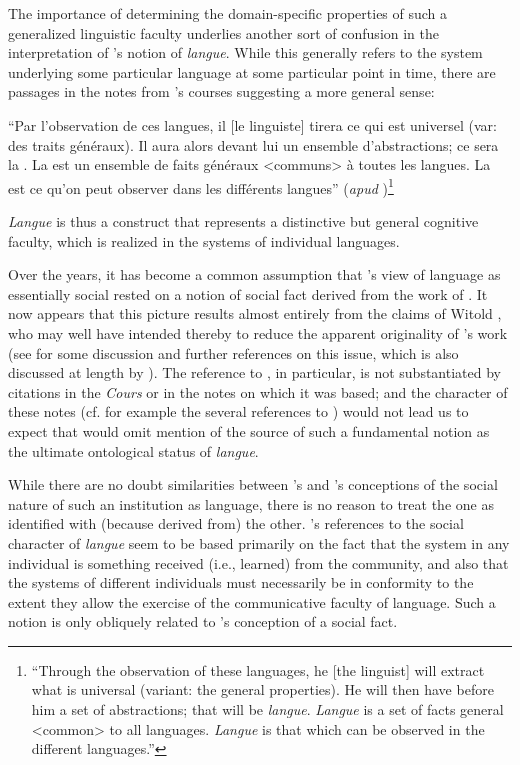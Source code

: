 The importance of determining the domain-specific properties of such a
generalized linguistic faculty underlies another sort of confusion in
the interpretation of {\Saussure}'s notion of \emph{langue}.  While this
generally refers to the system underlying some particular language at
some particular point in time, there are passages in the notes from
{\Saussure}'s courses suggesting a more general sense:

\begin{modquote}
  ``Par l'observation de ces langues, il [le linguiste] tirera ce qui
  est universel (var: des traits généraux).  Il aura alors devant
  lui un ensemble d'abstractions; ce sera la .  La  est un
  ensemble de faits généraux <communs> à toutes les langues.  La
   est ce qu'on peut observer dans les différents langues''
  (\emph{apud} \citealt[157]{godel57:sources})\footnote{``Through the observation of
    these languages, he {[the linguist]} will extract what is
    universal (variant: the general properties). He will then have
    before him a set of abstractions; that will be
    \emph{langue}. \emph{Langue} is a set of facts general <common> to
    all languages. \emph{Langue} is that which can be observed in the
    different languages.''}
\end{modquote}
\emph{Langue} is thus a construct that represents a distinctive
but general cognitive faculty, which is realized in the systems of
individual languages.

Over the years, it has become a common assumption that {\Saussure}'s view
of language as essentially social rested on a notion of social fact
derived from the work of .  It now appears that this picture
results almost entirely from the claims of Witold
\citet{doroszewski33:remarks,doroszewski33:saussure}, who may well
have intended thereby to reduce the apparent originality of {\Saussure}'s
work (see \citet[393f, 397f]{percival77:rvw.koerner.saussure} for some
discussion and further references on this issue, which is also
discussed at length by \citet{koerner73:saussure}).  The reference to
{\Durkheim}, in particular, is not substantiated by citations in the
\textsl{Cours} or in the notes on which it was based; and the
character of these notes (cf.  for example the several references to
{\Whitney}) would not lead us to expect that {\Saussure} would omit mention
of the source of such a fundamental notion as the ultimate ontological
status of \emph{langue}.

While there are no doubt similarities between {\Saussure}'s and
{\Durkheim}'s conceptions of the social nature of such an institution as
language, there is no reason to treat the one as identified with
(because derived from) the other.  {\Saussure}'s references to the social
character of \emph{langue} seem to be based primarily on the fact that
the system in any individual is something received (i.e., learned)
from the community, and also that the systems of different individuals
must necessarily be in conformity to the extent they allow the
exercise of the communicative faculty of language.  Such a notion is
only obliquely related to {\Durkheim}'s conception of a social fact.


